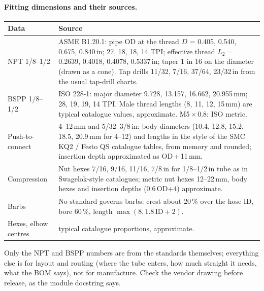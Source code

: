 \paragraph{Fitting dimensions and their sources.}
\begin{center}
\small
\begin{tabularx}{\linewidth}{@{}lX@{}}
\toprule
Data & Source \\
\midrule
NPT 1/8--1/2 & ASME B1.20.1: pipe OD at the thread $D$ = 0.405, 0.540, 0.675, 0.840\,in; 27, 18, 18, 14 TPI;
               effective thread $L_2$ = 0.2639, 0.4018, 0.4078, 0.5337\,in; taper 1 in 16 on the diameter (drawn as
               a cone). Tap drills 11/32, 7/16, 37/64, 23/32\,in from the usual tap-drill charts. \\
BSPP 1/8--1/2 & ISO 228-1: major diameter 9.728, 13.157, 16.662, 20.955\,mm; 28, 19, 19, 14 TPI. Male thread
               lengths (8, 11, 12, 15\,mm) are typical catalogue values, approximate. M5\,$\times$\,0.8: ISO metric. \\
Push-to-connect & 4--12\,mm and 5/32--3/8\,in: body diameters (10.4, 12.8, 15.2, 18.5, 20.9\,mm for 4--12) and
               lengths in the style of the SMC KQ2 / Festo QS catalogue tables, from memory and rounded; insertion
               depth approximated as OD\,+\,11\,mm. \\
Compression & Nut hexes 7/16, 9/16, 11/16, 7/8\,in for 1/8--1/2\,in tube as in Swagelok-style catalogues; metric nut
               hexes 12--22\,mm, body hexes and insertion depths ($0.6\,$OD$+4$) approximate. \\
Barbs & No standard governs barbs: crest about 20\,\% over the hose ID, bore 60\,\%, length $\max(8, 1.8\,\mathrm{ID}+2)$. \\
Hexes, elbow centres & typical catalogue proportions, approximate. \\
\bottomrule
\end{tabularx}
\end{center}
Only the NPT and BSPP numbers are from the standards themselves; everything else is for layout and routing (where
the tube enters, how much straight it needs, what the BOM says), not for manufacture. Check the vendor drawing before
release, as the module docstring says.

